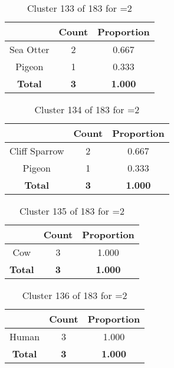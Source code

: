 \begin{table}[ht!]
\centering
\begin{tabular}{|c|c|c|}
\hline
\bf \Spec{} &\bf Count &\bf Proportion\\ \hline \hline
Sea Otter & 2 & 0.667\\ \hline
Pigeon & 1 & 0.333\\ \hline
\hline
\bf Total & \bf 3 & \bf 1.000\\ \hline
\end{tabular}
\label{tab:cluster:133:2}
\caption{Cluster 133 of 183 for \minneigh{}=2}
\end{table}

\begin{table}[ht!]
\centering
\begin{tabular}{|c|c|c|}
\hline
\bf \Spec{} &\bf Count &\bf Proportion\\ \hline \hline
Cliff Sparrow & 2 & 0.667\\ \hline
Pigeon & 1 & 0.333\\ \hline
\hline
\bf Total & \bf 3 & \bf 1.000\\ \hline
\end{tabular}
\label{tab:cluster:134:2}
\caption{Cluster 134 of 183 for \minneigh{}=2}
\end{table}

\begin{table}[ht!]
\centering
\begin{tabular}{|c|c|c|}
\hline
\bf \Spec{} &\bf Count &\bf Proportion\\ \hline \hline
Cow & 3 & 1.000\\ \hline
\hline
\bf Total & \bf 3 & \bf 1.000\\ \hline
\end{tabular}
\label{tab:cluster:135:2}
\caption{Cluster 135 of 183 for \minneigh{}=2}
\end{table}

\begin{table}[ht!]
\centering
\begin{tabular}{|c|c|c|}
\hline
\bf \Spec{} &\bf Count &\bf Proportion\\ \hline \hline
Human & 3 & 1.000\\ \hline
\hline
\bf Total & \bf 3 & \bf 1.000\\ \hline
\end{tabular}
\label{tab:cluster:136:2}
\caption{Cluster 136 of 183 for \minneigh{}=2}
\end{table}

